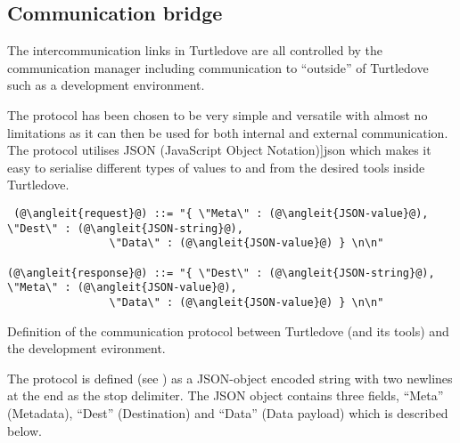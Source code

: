 \subsection{Communication bridge}

The intercommunication links in Turtledove are all controlled by the
communication manager including communication to ``outside'' of Turtledove such
as a development environment. 

\def \protocoljson {\Fref[plain]{fig:protocol-json}}

The protocol has been chosen to be very simple and versatile with almost no
limitations as it can then be used for both internal and external
communication. The protocol utilises JSON (JavaScript Object
Notation)\cite[\protocoljson]{json} which makes it easy to serialise different types of values
to and from the desired tools inside Turtledove.


\begin{nonfloatingfigure}
{ %
  \newcommand{\angleit}[1]{$\langle$\textnormal{\textit{#1}}$\rangle$}
\begin{lstlisting}
 (@\angleit{request}@) ::= "{ \"Meta\" : (@\angleit{JSON-value}@), \"Dest\" : (@\angleit{JSON-string}@),
                \"Data\" : (@\angleit{JSON-value}@) } \n\n"

(@\angleit{response}@) ::= "{ \"Dest\" : (@\angleit{JSON-string}@), \"Meta\" : (@\angleit{JSON-value}@),
                \"Data\" : (@\angleit{JSON-value}@) } \n\n"
\end{lstlisting}    
}
  
  \caption{Definition of the communication protocol between Turtledove (and its
    tools) and the development evironment.}
  \label{fig:intercom-protocol-def}
\end{nonfloatingfigure}


The protocol is defined (see ) as a JSON-object
encoded string with two newlines at the end as the stop delimiter. The JSON
object contains three fields, ``Meta'' (Metadata), ``Dest'' (Destination) and
``Data'' (Data payload) which is described below.

